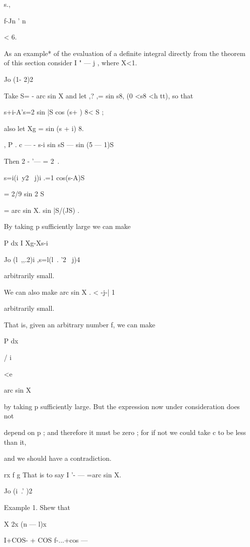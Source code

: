  s., 



  f-Jn ' n 



< 6. 

As an example* of the evaluation of a definite integral directly from the theorem 
of this section consider I "  — j , where X<1. 

Jo (1- 2)2 

Take S= - arc sin X and let ,? ,= sin s8, (0 <s8 <h tt), so that 

 s+i-A's=2 sin |S cos (s+ ) 8< S ; 

also let Xg = sin (s + i) 8. 

 , P . c — - s-i   sin sS — sin (5 — 1)S 

Then 2 -  '— = 2   \,.   

s=i(i\ y2 \ j)i .=1 cos(s-A)S 

= 2/9 sin 2 S 

= arc sin X.  sin |S/(JS) . 

By taking p sufficiently large we can make 



P dx I Xg-Xs-i 

Jo (l\ ,,.2)i ,s=l(l\ . '2 \ j)4 



arbitrarily small. 

We can also make arc sin X . < -j-| 1 

arbitrarily small. 

That is, given an arbitrary number f, we can make 



P dx 

/ i~ 



<e 



arc sin X 

by taking p sufficiently large. But the expression now under consideration does not 

depend on p ; and therefore it must be zero ; for if not we could take c to be less than it, 

and we should have a contradiction. 

rx f g 
That is to say I '- —  =arc sin X. 

Jo (i\  .' )2 

Example 1. Shew that 

X 2x (n — l)x 

I+COS- + COS f-...+cos  — 

